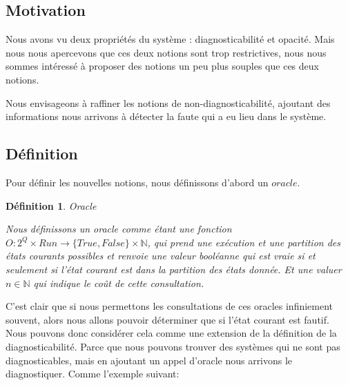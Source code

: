 \documentclass[a4paper,10pt]{article}
\newtheorem{mydef}{D\'efinition}
\begin{document}
\subsection{Motivation}

Nous avons vu deux propri\'et\'es du syst\`eme : diagnosticabilit\'e et opacit\'e. Mais nous nous apercevons que ces deux notions sont trop restrictives, nous nous sommes int\'eress\'e \`a proposer des notions un peu plus souples que ces deux notions.

Nous envisageons \`a raffiner les notions de non-diagnosticabilit\'e, ajoutant des informations nous arrivons \`a d\'etecter la faute qui a eu lieu dans le syst\`eme.

\subsection{D\'efinition}

Pour d\'efinir les nouvelles notions, nous d\'efinissons d'abord un $oracle$.

\begin{mydef}{Oracle}

  Nous d\'efinissons un oracle comme \'etant une fonction $O: 2^Q\times Run \to \{True, False\} \times \mathbb{N}$, qui prend une ex\'ecution et une partition des \'etats courants possibles et renvoie une valeur bool\'eanne qui est vraie si et seulement si l'\'etat courant est dans la partition des \'etats donn\'ee. Et une valuer $n \in \mathbb{N}$ qui indique le co\^ut de cette consultation.

\end{mydef}

C'est clair que si nous permettons les consultations de ces oracles infiniement souvent, alors nous allons pouvoir d\'eterminer que si l'\'etat courant est fautif. Nous pouvons donc consid\'erer cela comme une extension de la d\'efinition de la diagnosticabilit\'e. Parce que nous pouvons trouver des syst\`emes qui ne sont pas diagnosticables, mais en ajoutant un appel d'oracle nous arrivons le diagnostiquer. Comme l'exemple suivant:

\begin{figure}[H]
  \begin{center}
  \end{center}
\end{figure}
\end{document}
